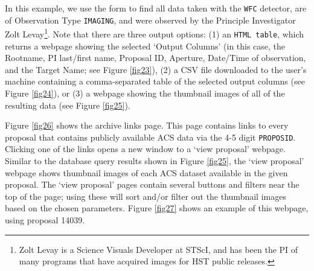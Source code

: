 \documentclass[10pt,journal,compsoc]{IEEEtran}
\begin{document}
In this example, we use the form to find all data taken with the \texttt{WFC} detector, are of Observation Type \texttt{IMAGING}, and were observed by the Principle Investigator
Zolt Levay\footnote{Zolt Levay is a Science Visuals Developer at STScI, and has been the PI of many programs that have acquired images for HST public releases.}.  Note that there are three
output options: (1) an \texttt{HTML table}, which returns a webpage showing the selected `Output Columns' (in this case, the Rootname, PI last/first name, Proposal ID, Aperture, Date/Time of
observation, and the Target Name; see Figure \ref{fig23}), (2) a CSV file downloaded to the user's machine containing a comma-separated table of the selected output columns
(see Figure \ref{fig24}), or (3) a webpage showing the thumbnail images of all of the resulting data (see Figure \ref{fig25}).

Figure \ref{fig26} shows the archive links page.  This page contains links to every proposal that contains publicly available ACS data via the 4-5 digit \texttt{PROPOSID}.  Clicking one
of the links opens a new window to a `view proposal' webpage.  Similar to the database query results shown in Figure \ref{fig25}, the `view proposal' webpage shows
thumbnail images of each ACS dataset available in the given proposal.  The `view proposal' pages contain several buttons and filters near the top of the page; using these will sort and/or
filter out the thumbnail images based on the chosen parameters.  Figure \ref{fig27} shows an example of this webpage, using proposal 14039.
\end{document}
